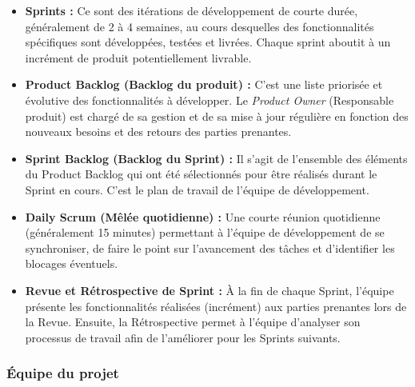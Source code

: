 \documentclass[12pt, a4paper, openany]{report}
\begin{document}
\vspace{-0.3cm}
\begin{itemize}
    \renewcommand{\labelitemi}{\textcolor{royalBlue}{\rule{1.2ex}{1.2ex}}} %
    \setlength{\itemsep}{0.3cm}
    
    \item \textcolor{primaryBlue}{\textbf{Sprints :}} Ce sont des itérations de développement de courte durée, généralement de 2 à 4 semaines, au cours desquelles des fonctionnalités spécifiques sont développées, testées et livrées. Chaque sprint aboutit à un incrément de produit potentiellement livrable.
    
    \vspace{-0.3cm}
    \item \textcolor{primaryBlue}{\textbf{Product Backlog (Backlog du produit) :}} C'est une liste priorisée et évolutive des fonctionnalités à développer. Le \textit{Product Owner} (Responsable produit) est chargé de sa gestion et de sa mise à jour régulière en fonction des nouveaux besoins et des retours des parties prenantes.

    \vspace{-0.3cm}
    \item \textcolor{primaryBlue}{\textbf{Sprint Backlog (Backlog du Sprint) :}} Il s'agit de l'ensemble des éléments du Product Backlog qui ont été sélectionnés pour être réalisés durant le Sprint en cours. C'est le plan de travail de l'équipe de développement.

    \vspace{-0.3cm}
    \item \textcolor{primaryBlue}{\textbf{Daily Scrum (Mêlée quotidienne) :}} Une courte réunion quotidienne (généralement 15 minutes) permettant à l'équipe de développement de se synchroniser, de faire le point sur l'avancement des tâches et d'identifier les blocages éventuels.

    \vspace{-0.3cm}
    \item \textcolor{primaryBlue}{\textbf{Revue et Rétrospective de Sprint :}} À la fin de chaque Sprint, l'équipe présente les fonctionnalités réalisées (incrément) aux parties prenantes lors de la Revue. Ensuite, la Rétrospective permet à l'équipe d'analyser son processus de travail afin de l'améliorer pour les Sprints suivants.
\end{itemize}

\vspace{-0.6cm}

\subsubsection{Équipe du projet}
\end{document}
